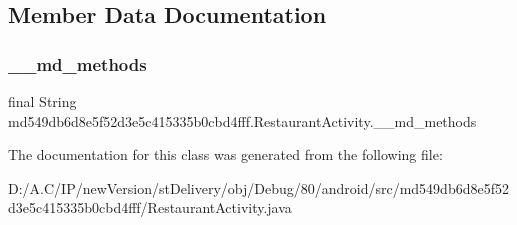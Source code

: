 \subsection{Member Data Documentation}
\mbox{\label{classmd549db6d8e5f52d3e5c415335b0cbd4fff_1_1_restaurant_activity_a08dd15ecf61daf10b2eabfbbb22d867d}} 
\subsubsection{\texorpdfstring{\+\_\+\+\_\+md\+\_\+methods}{\_\_md\_methods}}
{\footnotesize\ttfamily final String md549db6d8e5f52d3e5c415335b0cbd4fff.\+Restaurant\+Activity.\+\_\+\+\_\+md\+\_\+methods\hspace{0.3cm}{\ttfamily [static]}}



The documentation for this class was generated from the following file\+:\begin{DoxyCompactItemize}
\item 
D\+:/\+A.\+C/\+I\+P/new\+Version/st\+Delivery/obj/\+Debug/80/android/src/md549db6d8e5f52d3e5c415335b0cbd4fff/Restaurant\+Activity.\+java\end{DoxyCompactItemize}
